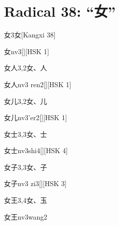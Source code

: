 
\section*{Radical 38: ``⼥''}

\begin{entry}{女}{3}{⼥}[Kangxi 38]
  \begin{phonetics}{女}{nv3}[][HSK 1]
  \end{phonetics}
\end{entry}

\begin{entry}{女人}{3,2}{⼥、⼈}
  \begin{phonetics}{女人}{nv3 ren2}[][HSK 1]
  \end{phonetics}
\end{entry}

\begin{entry}{女儿}{3,2}{⼥、⼉}
  \begin{phonetics}{女儿}{nv3'er2}[][HSK 1]
  \end{phonetics}
\end{entry}

\begin{entry}{女士}{3,3}{⼥、⼠}
  \begin{phonetics}{女士}{nv3shi4}[][HSK 4]
  \end{phonetics}
\end{entry}

\begin{entry}{女子}{3,3}{⼥、⼦}
  \begin{phonetics}{女子}{nv3 zi3}[][HSK 3]
  \end{phonetics}
\end{entry}

\begin{entry}{女王}{3,4}{⼥、⽟}
  \begin{phonetics}{女王}{nv3wang2}
  \end{phonetics}
\end{entry}

